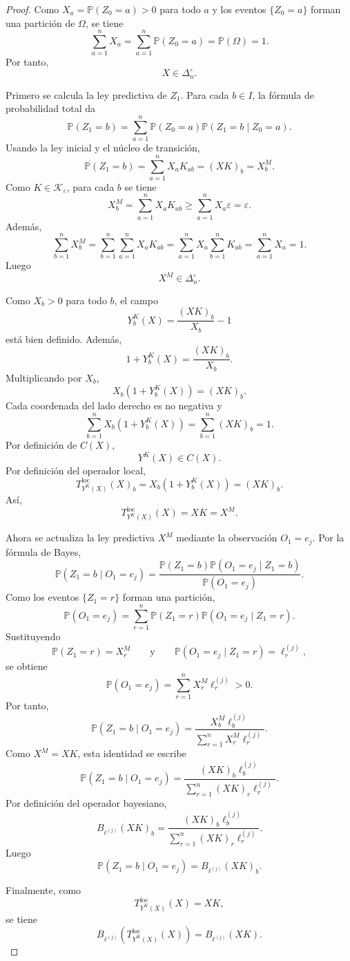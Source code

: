\documentclass[12pt]{article}
\begin{document}
\begin{proof}
Como \(X_a=\mathbb P(Z_0=a)>0\) para todo \(a\) y los eventos \(\{Z_0=a\}\) forman una partición de \(\Omega\), se tiene
\[
\sum_{a=1}^nX_a
=
\sum_{a=1}^n\mathbb P(Z_0=a)
=
\mathbb P(\Omega)
=
1.
\]
Por tanto,
\[
X\in\Delta_n^\circ.
\]

Primero se calcula la ley predictiva de \(Z_1\). Para cada \(b\in I\), la fórmula de probabilidad total da
\[
\mathbb P(Z_1=b)
=
\sum_{a=1}^n
\mathbb P(Z_0=a)\mathbb P(Z_1=b\mid Z_0=a).
\]
Usando la ley inicial y el núcleo de transición,
\[
\mathbb P(Z_1=b)
=
\sum_{a=1}^nX_aK_{ab}
=
(XK)_b
=
X_b^M.
\]
Como \(K\in\mathcal K_\varepsilon\), para cada \(b\) se tiene
\[
X_b^M
=
\sum_{a=1}^nX_aK_{ab}
\ge
\sum_{a=1}^nX_a\varepsilon
=
\varepsilon.
\]
Además,
\[
\sum_{b=1}^nX_b^M
=
\sum_{b=1}^n\sum_{a=1}^nX_aK_{ab}
=
\sum_{a=1}^nX_a\sum_{b=1}^nK_{ab}
=
\sum_{a=1}^nX_a
=
1.
\]
Luego
\[
X^M\in\Delta_n^\circ.
\]

Como \(X_b>0\) para todo \(b\), el campo
\[
Y_b^K(X)
=
\frac{(XK)_b}{X_b}-1
\]
está bien definido. Además,
\[
1+Y_b^K(X)
=
\frac{(XK)_b}{X_b}.
\]
Multiplicando por \(X_b\),
\[
X_b(1+Y_b^K(X))
=
(XK)_b.
\]
Cada coordenada del lado derecho es no negativa y
\[
\sum_{b=1}^nX_b(1+Y_b^K(X))
=
\sum_{b=1}^n(XK)_b
=
1.
\]
Por definición de \(C(X)\),
\[
Y^K(X)\in C(X).
\]
Por definición del operador local,
\[
T^{\mathrm{loc}}_{Y^K(X)}(X)_b
=
X_b(1+Y_b^K(X))
=
(XK)_b.
\]
Así,
\[
T^{\mathrm{loc}}_{Y^K(X)}(X)=XK=X^M.
\]

Ahora se actualiza la ley predictiva \(X^M\) mediante la observación \(O_1=e_j\). Por la fórmula de Bayes,
\[
\mathbb P(Z_1=b\mid O_1=e_j)
=
\frac{\mathbb P(Z_1=b)\mathbb P(O_1=e_j\mid Z_1=b)}
{\mathbb P(O_1=e_j)}.
\]
Como los eventos \(\{Z_1=r\}\) forman una partición,
\[
\mathbb P(O_1=e_j)
=
\sum_{r=1}^n
\mathbb P(Z_1=r)\mathbb P(O_1=e_j\mid Z_1=r).
\]
Sustituyendo
\[
\mathbb P(Z_1=r)=X_r^M
\qquad
\text{y}
\qquad
\mathbb P(O_1=e_j\mid Z_1=r)=\ell_r^{(j)},
\]
se obtiene
\[
\mathbb P(O_1=e_j)
=
\sum_{r=1}^nX_r^M\ell_r^{(j)}
>
0.
\]
Por tanto,
\[
\mathbb P(Z_1=b\mid O_1=e_j)
=
\frac{X_b^M\ell_b^{(j)}}
{\sum_{r=1}^nX_r^M\ell_r^{(j)}}.
\]
Como \(X^M=XK\), esta identidad se escribe
\[
\mathbb P(Z_1=b\mid O_1=e_j)
=
\frac{(XK)_b\ell_b^{(j)}}
{\sum_{r=1}^n(XK)_r\ell_r^{(j)}}.
\]
Por definición del operador bayesiano,
\[
B_{\ell^{(j)}}(XK)_b
=
\frac{(XK)_b\ell_b^{(j)}}
{\sum_{r=1}^n(XK)_r\ell_r^{(j)}}.
\]
Luego
\[
\mathbb P(Z_1=b\mid O_1=e_j)
=
B_{\ell^{(j)}}(XK)_b.
\]

Finalmente, como
\[
T^{\mathrm{loc}}_{Y^K(X)}(X)=XK,
\]
se tiene
\[
B_{\ell^{(j)}}\!\left(T^{\mathrm{loc}}_{Y^K(X)}(X)\right)
=
B_{\ell^{(j)}}(XK).
\]
\end{proof}
\end{document}
